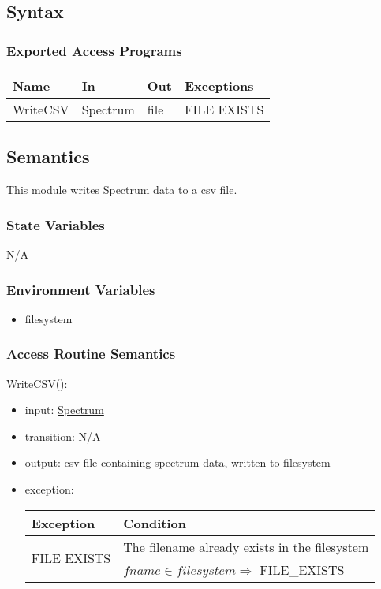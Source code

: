 \documentclass[12pt, titlepage]{article}
\begin{document}
\subsection{Syntax}

\subsubsection{Exported Access Programs}

\begin{center}
    \begin{tabular}{p{2cm} p{4cm} p{3cm} p{4cm}}
        \hline
        \textbf{Name} & \textbf{In} & \textbf{Out} & \textbf{Exceptions} \\
        \hline
        WriteCSV & Spectrum & file & FILE EXISTS \\
        \hline
    \end{tabular}
\end{center}

\subsection{Semantics}
This module writes Spectrum data to a csv file.

\subsubsection{State Variables}
N/A

\subsubsection{Environment Variables}
\begin{itemize}
    \item filesystem
\end{itemize}

\subsubsection{Access Routine Semantics}

\noindent WriteCSV():
\begin{itemize}
    \item input: \hyperref[Mod:Spectrum]{Spectrum}
    \item transition: N/A
    \item output: csv file containing spectrum data, written to filesystem
    \item exception:
    \begin{center}
        \begin{tabular}{p{3cm} p{12cm}}
            \toprule[0.15em]
            \textbf{Exception} & \textbf{Condition}\\
            \midrule[0.1em]
            \multirow{2}{0.25\textwidth}{FILE EXISTS} & The filename already
            exists in the filesystem\\ 
            & $fname \in filesystem \Rightarrow$ FILE\_EXISTS\\ 
            \bottomrule[0.15em]
        \end{tabular}
    \end{center}
\end{itemize}
\end{document}
